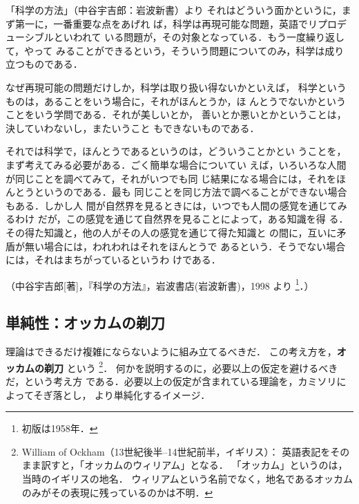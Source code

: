 \begin{memo}{「科学の方法」（中谷宇吉郎：岩波新書）より}
                    それはどういう面かというに，まず第一に，一番重要な点をあげれ
                    ば，科学は再現可能な問題，英語でリプロデューシブルといわれて
                    いる問題が，その対象となっている．もう一度繰り返して，やって
                    みることができるという，そういう問題についてのみ，科学は成り
                    立つものである．

                    なぜ再現可能の問題だけしか，科学は取り扱い得ないかといえば，
                    科学というものは，あることをいう場合に，それがほんとうか，ほ
                    んとうでないかということをいう学問である．それが美しいとか，
                    善いとか悪いとかということは，決していわないし，またいうこと
                    もできないものである．

                    それでは科学で，ほんとうであるというのは，どういうことかとい
                    うことを，まず考えてみる必要がある．ごく簡単な場合についてい
                    えば，いろいろな人間が同じことを調べてみて，それがいつでも同
                    じ結果になる場合には，それをほんとうというのである．最も
                    同じことを同じ方法で調べることができない場合もある．しかし人
                    間が自然界を見るときには，いつでも人間の感覚を通じてみるわけ
                    だが，この感覚を通じて自然界を見ることによって，ある知識を得
                    る．その得た知識と，他の人がその人の感覚を通じて得た知識と
                    の間に，互いに矛盾が無い場合には，われわれはそれをほんとうで
                    あるという．そうでない場合には，それはまちがっているというわ
                    けである．

                    （中谷宇吉郎[著]，『科学の方法』，岩波書店(岩波新書)，1998 より
                    \footnote{
                        初版は1958年．
                    }．）
                \end{memo}


        \subsection{単純性：オッカムの剃刀}
            理論はできるだけ複雑にならないように組み立てるべきだ．
            この考え方を，\textbf{オッカムの剃刀} という
                \footnote{
                    William of Ockham（13世紀後半--14世紀前半，イギリス）：
                    英語表記をそのまま訳すと，「オッカムのウィリアム」となる．
                    「オッカム」というのは，当時のイギリスの地名．
                    ウィリアムという名前でなく，地名であるオッカム
                    のみがその表現に残っているのかは不明．
                }．
            何かを説明するのに，必要以上の仮定を避けるべきだ，という考え方
            である．必要以上の仮定が含まれている理論を，カミソリによってそぎ落とし，
            より単純化するイメージ．

